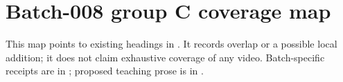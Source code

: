 \section{Batch-008 group C coverage map}\label{appendix-877738f6f4d2-batch-008-group-c-coverage-map}

\hypertarget{appendix-877738f6f4d2-batch-008-group-c-coverage-map}{}

This map points to existing headings in . It records overlap or a possible local addition; it does not claim exhaustive coverage of any video. Batch-specific receipts are in ; proposed teaching prose is in .

